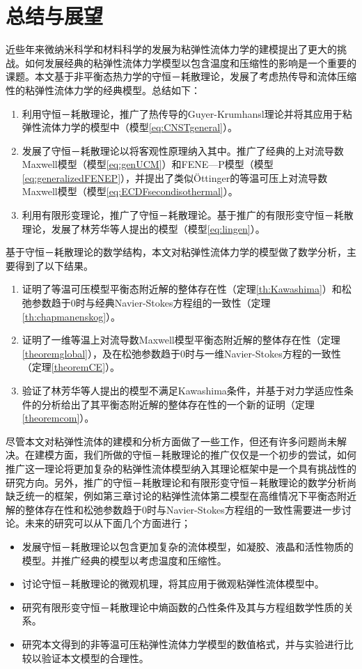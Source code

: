 \chapter{总结与展望}

% 
近些年来微纳米科学和材料科学的发展为粘弹性流体力学的建模提出了更大的挑战。如何发展经典的粘弹性流体力学模型以包含温度和压缩性的影响是一个重要的课题。本文基于非平衡态热力学的守恒－耗散理论，发展了考虑热传导和流体压缩性的粘弹性流体力学的经典模型。总结如下：
\begin{enumerate}
	\item 利用守恒－耗散理论，推广了热传导的Guyer-Krumhansl理论并将其应用于粘弹性流体力学的模型中（模型\eqref{eq:CNSTgeneral}）。
	\item 发展了守恒－耗散理论以将客观性原理纳入其中。推广了经典的上对流导数Maxwell模型（模型\eqref{eq:genUCM}）和FENE—P模型（模型\eqref{eq:generalizedFENEP}），并提出了类似\"Ottinger的等温可压上对流导数Maxwell模型（模型\eqref{eq:ECDFsecondisothermal}）。
	\item 利用有限形变理论，推广了守恒－耗散理论。基于推广的有限形变守恒－耗散理论，发展了林芳华等人提出的模型（模型\eqref{eq:lingen}）。
\end{enumerate}

基于守恒－耗散理论的数学结构，本文对粘弹性流体力学的模型做了数学分析，主要得到了以下结果。
\begin{enumerate}
	\item 证明了等温可压模型平衡态附近解的整体存在性（定理\ref{th:Kawashima}）和松弛参数趋于$0$时与经典Navier-Stokes方程组的一致性（定理\ref{th:chapmanenskog}）。
	\item 证明了一维等温上对流导数Maxwell模型平衡态附近解的整体存在性（定理\ref{theoremglobal}），及在松弛参数趋于$0$时与一维Navier-Stokes方程的一致性（定理\ref{theoremCE}）。
	\item 验证了林芳华等人提出的模型不满足Kawashima条件，并基于对力学适应性条件的分析给出了其平衡态附近解的整体存在性的一个新的证明（定理\ref{theoremcom}）。
\end{enumerate}

尽管本文对粘弹性流体的建模和分析方面做了一些工作，但还有许多问题尚未解决。在建模方面，我们所做的守恒－耗散理论的推广仅仅是一个初步的尝试，如何推广这一理论将更加复杂的粘弹性流体模型纳入其理论框架中是一个具有挑战性的研究方向。另外，推广的守恒－耗散理论和有限形变守恒－耗散理论的数学分析尚缺乏统一的框架，例如第三章讨论的粘弹性流体第二模型在高维情况下平衡态附近解的整体存在性和松弛参数趋于$0$时与Navier-Stokes方程组的一致性需要进一步讨论。未来的研究可以从下面几个方面进行；
\begin{itemize}
	\item 发展守恒－耗散理论以包含更加复杂的流体模型，如凝胶、液晶和活性物质的模型。并推广经典的模型以考虑温度和压缩性。
	\item 讨论守恒－耗散理论的微观机理，将其应用于微观粘弹性流体模型中。
	\item 研究有限形变守恒－耗散理论中熵函数的凸性条件及其与方程组数学性质的关系。
	\item 研究本文得到的非等温可压粘弹性流体力学模型的数值格式，并与实验进行比较以验证本文模型的合理性。
\end{itemize}

% 